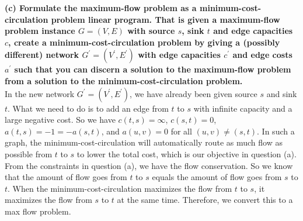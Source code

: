 \documentclass{article}
\begin{document}
\newline
\textbf{(c) Formulate the maximum-flow problem as a minimum-cost-circulation problem linear program. That is given a maximum-flow problem instance $G = (V, E)$ with source $s$, sink $t$ and edge capacities $c$, create a minimum-cost-circulation problem by giving a (possibly different) network $G^{'} = (V^{'}, E^{'})$ with edge capacities $c^{'}$ and edge costs $a^{'}$ such that you can discern a solution to the maximum-flow problem from a solution to the minimum-cost-circulation problem.}\\ \newline
In the new network $G^{'} = (V^{'}, E^{'})$, we have already been given source $s$ and sink $t$. What we need to do is to add an edge from $t$ to $s$ with infinite capacity and a large negative cost. So we have $c(t, s) = \infty$, $c(s, t) = 0$,  $a(t, s) = -1 = -a(s, t)$, and $a(u, v) = 0$ for all $(u, v) \neq (s, t)$. In such a graph, the minimum-cost-circulation will automatically route as much flow as possible from $t$ to $s$ to lower the total cost, which is our objective in question (a). From the constraints in question (a), we have the flow conservation. So we know that the amount of flow goes from $t$ to $s$ equals the amount of flow goes from $s$ to $t$. When the minimum-cost-circulation maximizes the flow from $t$ to $s$, it maximizes the flow from $s$ to $t$ at the same time. Therefore, we convert this to a max flow problem. 
\end{document}

